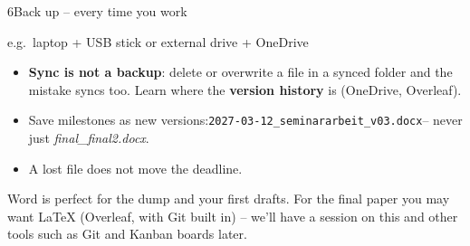 \begin{wsbox}{6}{Back up – every time you work}
\begin{minipage}[t]{0.4\linewidth}\vspace{0pt}
\par\vspace{1mm}
{\footnotesize e.g.\ laptop + USB stick or external drive + OneDrive}
\end{minipage}\hfill
\begin{minipage}[t]{0.57\linewidth}\vspace{0pt}\raggedright
\begin{itemize}[itemsep=0.4mm]
\item \textbf{Sync is not a backup}: delete or overwrite a file in a synced folder and the mistake syncs too. Learn where the \textbf{version history} is (OneDrive, Overleaf).
\item Save milestones as new versions:\newline \texttt{\footnotesize 2027-03-12\_seminararbeit\_v03.docx}\newline – never just \emph{final\_final2.docx}.
\item A lost file does not move the deadline.
\end{itemize}
\end{minipage}
\par\vspace{1.5mm}
\begin{lueckentext}
 \luecke[42mm] \luecke[42mm] \luecke[42mm]\par
\end{lueckentext}
\vspace{0.8mm}
{\footnotesize\textcolor{muted}{Word is perfect for the dump and your first drafts. For the final paper you may want LaTeX (Overleaf, with Git built in) – we'll have a session on this and other tools such as Git and Kanban boards later.}}
\end{wsbox}


